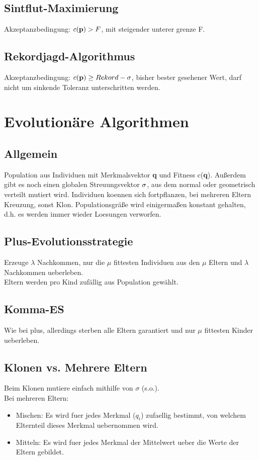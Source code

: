 \documentclass[]{scrartcl}
\begin{document}
\subsection{Sintflut-Maximierung}
Akzeptanzbedingung: $ c({\bf p}) > F $, mit steigender unterer grenze F.

\subsection{Rekordjagd-Algorithmus}
Akzeptanzbedingung: $ c({\bf p}) \geq Rekord - \sigma $, bisher bester gesehener Wert, darf nicht um sinkende Toleranz unterschritten werden.

\section{Evolutionäre Algorithmen}
\subsection{Allgemein}
Population aus Individuen mit Merkmalsvektor \textbf{q} und Fitness c(\textbf{q}). Außerdem gibt es noch einen globalen Streuungsvektor $ {\bf \sigma} $, aus dem normal oder geometrisch verteilt mutiert wird. Individuen koennen sich fortpflanzen, bei mehreren Eltern Kreuzung, sonst Klon. Populationsgräße wird einigermaßen konstant gehalten, d.h. es werden immer wieder Loesungen verworfen.

\subsection{Plus-Evolutionsstrategie}
Erzeuge $ \lambda $ Nachkommen, nur die $ \mu $ fittesten Individuen aus den $ \mu $ Eltern und $ \lambda $ Nachkommen ueberleben.\\
Eltern werden pro Kind zufällig aus Population gewählt.

\subsection{Komma-ES}
Wie bei plus, allerdings sterben alle Eltern garantiert und nur $ \mu $ fittesten Kinder ueberleben.

\subsection{Klonen vs. Mehrere Eltern}
Beim Klonen mutiere einfach mithilfe von $ \sigma $ (s.o.).\\
Bei mehreren Eltern:
\begin{itemize}
\item Mischen: Es wird fuer jedes Merkmal ($ q_{i} $) zufaellig bestimmt, von welchem Elternteil dieses Merkmal uebernommen wird.
\item Mitteln: Es wird fuer jedes Merkmal der Mittelwert ueber die Werte der Eltern gebildet.
\end{itemize}
\end{document}
